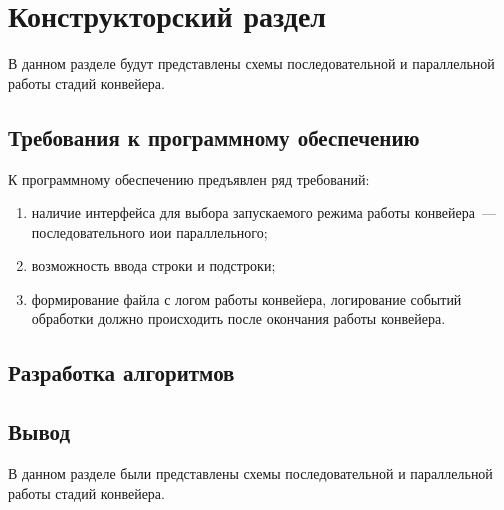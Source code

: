 \chapter{Конструкторский раздел}
В данном разделе будут представлены схемы последовательной и параллельной работы стадий конвейера.

\section{Требования к программному обеспечению}
К программному обеспечению предъявлен ряд требований:
\begin{enumerate}
	\item наличие интерфейса для выбора запускаемого режима работы конвейера~--- последовательного иои параллельного;
	\item возможность ввода строки и подстроки;
	\item формирование файла с логом работы конвейера, логирование событий обработки должно происходить после окончания работы конвейера.
\end{enumerate}

\section{Разработка алгоритмов}


\section*{Вывод}
В данном разделе были представлены схемы последовательной и параллельной работы стадий конвейера.

